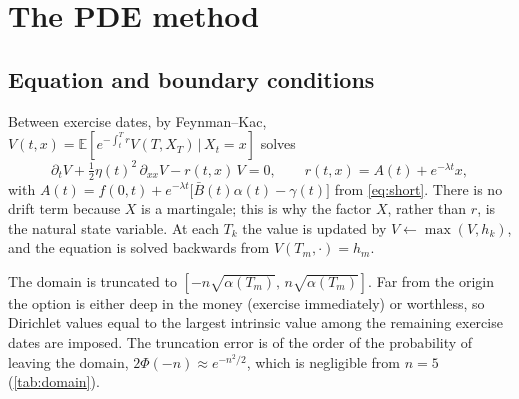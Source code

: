 \documentclass[11pt,a4paper]{article}
\theoremstyle{definition}
\theoremstyle{remark}
\newcommand{\E}{\mathbb{E}}
\newcommand{\Bb}{\bar B}
\begin{document}
\section{The PDE method}\label{sec:pde}
\subsection{Equation and boundary conditions}
Between exercise dates, by Feynman--Kac, $V(t,x)=\E[e^{-\int_t^{T}r}V(T,X_T)\,|\,X_t=x]$ solves
\begin{equation}\label{eq:pde}
  \partial_tV+\tfrac12\eta(t)^2\,\partial_{xx}V-r(t,x)\,V=0,\qquad r(t,x)=A(t)+e^{-\lambda t}x,
\end{equation}
with $A(t)=f(0,t)+e^{-\lambda t}\big[\Bb(t)\alpha(t)-\gamma(t)\big]$ from \eqref{eq:short}. There is no drift term because $X$ is
a martingale; this is why the factor $X$, rather than $r$, is the natural state variable. At each $T_k$ the value is
updated by $V\leftarrow\max(V,h_k)$, and the equation is solved backwards from $V(T_m,\cdot)=h_m$.

The domain is truncated to $[-n\sqrt{\alpha(T_m)},\,n\sqrt{\alpha(T_m)}]$. Far from the origin the option is either deep in
the money (exercise immediately) or worthless, so Dirichlet values equal to the largest intrinsic value among the remaining
exercise dates are imposed. The truncation error is of the order of the probability of leaving the domain,
$2\Phi(-n)\approx e^{-n^2/2}$, which is negligible from $n=5$ (\cref{tab:domain}).
\end{document}
